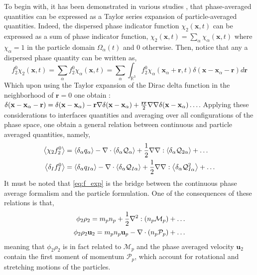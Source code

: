To begin with, it has been demonstrated in various studies \citep{nott2011suspension,jackson1997locally,zhang1994averaged}, that phase-averaged quantities can be expressed as a Taylor series expansion of particle-averaged quantities. 
Indeed, the dispersed phase indicator function $\chi_2(\textbf{x},t)$ can be expressed as a sum of phase indicator function, $\chi_2(\textbf{x},t) = \sum_\alpha\chi_\alpha(\textbf{x},t)$ where $\chi_\alpha =1$ in the particle domain $\Omega_\alpha(t)$ and $0$ otherwise. 
Then, notice that any a dispersed phase quantity can be written as, 
\begin{equation*}
    f^0_2 \chi_2(\textbf{x},t)
    = \sum_\alpha f^0_2 \chi_\alpha(\textbf{x},t) 
    = \sum_\alpha \int_{\mathbb{R}^3} f^0_2 \chi_\alpha(\textbf{x}_\alpha+\textbf{r},t)\delta(\textbf{x}- \textbf{x}_\alpha - \textbf{r}) d\textbf{r} 
\end{equation*}
Which upon using the Taylor expansion of the Dirac delta function in the neighborhood of $\textbf{r}=0$ one obtain :  $\delta(\textbf{x}- \textbf{x}_\alpha - \textbf{r}) = \delta(\textbf{x}- \textbf{x}_\alpha) - \textbf{r}\mathbf{\nabla} \delta(\textbf{x} - \textbf{x}_\alpha) + \frac{\textbf{rr}}{2}\mathbf{\nabla}\mathbf{\nabla}\delta(\textbf{x}- \textbf{x}_\alpha)\ldots $.
Applying these considerations to interfaces quantities and averaging over all configurations of the phase space, one obtain a general relation between continuous and particle averaged quantities, namely, 
\begin{align}
    \left<\chi_2f_2^0\right> 
    &=  \left<\delta_\alpha q_\alpha\right>
        - \mathbf{\nabla}\cdot  
        \left<\delta_\alpha \mathcal{Q}_\alpha\right>        
        + \frac{1}{2} \mathbf{\nabla}\mathbf{\nabla} : \left<\delta_\alpha \mathcal{Q}_{2\alpha}\right>
        + \ldots  
        \nonumber\\
    \left<\delta_I f_I^0\right> 
    &=  \left<\delta_\alpha q_{I\alpha}\right>        
        - \mathbf{\nabla}\cdot \left<\delta_\alpha \mathcal{Q}_{I\alpha}\right>
        + \frac{1}{2} \mathbf{\nabla}\mathbf{\nabla} : \left<\delta_\alpha \mathcal{Q}_{I\alpha}^{2}\right>
        + \ldots  
    \label{eq:f_exp}
\end{align}
It must be noted that \ref{eq:f_exp} is the bridge between the continuous phase average formalism and the particle formulation. 
One of the consequences of these relations is that, 
\begin{align}
    \phi_2 \rho_2
    = m_p n_p 
    + \frac{1}{2}\mathbf{\nabla}^2 : (n_p\mathcal{M}_p)+\ldots\\
    \phi_2 \rho_2 \textbf{u}_2
    = m_p n_p \textbf{u}_p 
    - \mathbf{\nabla}\cdot (n_p\mathcal{P}_p)+\ldots
    \label{eq:f_exp_exe}
\end{align}
meaning that $\phi_2\rho_2$ is in fact related to $\mathcal{M}_p$ and the phase averaged velocity $\textbf{u}_2$ contain the first  moment of momentum $\mathcal{P}_p$, which account for rotational and stretching motions of the particles. 

